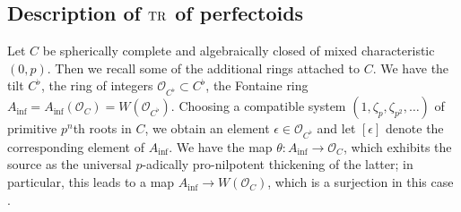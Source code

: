 \documentclass{amsart}
\theoremstyle{definition}
\begin{document}
\subsection{Description of $\mathrm{TR}$ of perfectoids}
\renewcommand{\inf}{\mathrm{inf}}

Let $C$ be spherically complete and algebraically closed of mixed
characteristic $(0, p)$. Then we recall some of
the additional rings attached to $C$. 
We have the tilt ${C}^{\flat}$, the ring of integers
$\mathcal{O}_{C^{\flat}} \subset C^{\flat}$, the 
Fontaine ring $A_{\inf} = A_{\inf}(\mathcal{O}_C)  = W(\mathcal{O}_{C^{\flat}})$. 
Choosing a compatible system $(1, \zeta_p, \zeta_{p^2}, \dots )$ of primitive $p^n$th roots
in $C$, we obtain an element $\epsilon \in \mathcal{O}_{C^{\flat}}$ 
and let $[\epsilon]$ denote the corresponding element of $A_{\inf}$. 
We have the map $\theta \colon A_{\inf} \to \mathcal{O}_C$, which exhibits the
source as the universal $p$-adically pro-nilpotent thickening of the latter; in
particular, this leads to a map $A_{\inf} \to W(\mathcal{O}_C)$, which is a
surjection in this case \cite[Lem.~3.23]{BMS1}. 
\end{document}
